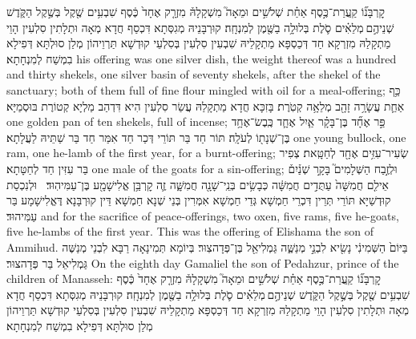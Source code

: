 {קׇרְבָּנ֞וֹ קַֽעֲרַת־כֶּ֣סֶף אַחַ֗ת שְׁלֹשִׁ֣ים וּמֵאָה֮ מִשְׁקָלָהּ֒ מִזְרָ֤ק אֶחָד֙ כֶּ֔סֶף שִׁבְעִ֥ים שֶׁ֖קֶל בְּשֶׁ֣קֶל הַקֹּ֑דֶשׁ שְׁנֵיהֶ֣ם \legarmeh  מְלֵאִ֗ים סֹ֛לֶת בְּלוּלָ֥ה בַשֶּׁ֖מֶן לְמִנְחָֽה׃}
{קוּרְבָּנֵיהּ מְגִסְּתָא דִּכְסַף חֲדָא מְאָה וּתְלָתִין סִלְעִין הָוֵי מַתְקָלַהּ מִזְרְקָא חַד דְּכַסְפָּא מַתְקָלֵיהּ שִׁבְעִין סִלְעִין בְּסִלְעֵי קוּדְשָׁא תַּרְוֵיהוֹן מְלַן סוּלְתָּא דְּפִילָא בִמְשַׁח לְמִנְחָתָא׃}
{his offering was one silver dish, the weight thereof was a hundred and thirty shekels, one silver basin of seventy shekels, after the shekel of the sanctuary; both of them full of fine flour mingled with oil for a meal-offering;}{}
{כַּ֥ף אַחַ֛ת עֲשָׂרָ֥ה זָהָ֖ב מְלֵאָ֥ה קְטֹֽרֶת׃}
{בָּזִכָּא חֲדָא מַתְקָלַהּ עֲשַׂר סִלְעִין הִיא דִּדְהַב מַלְיָא קְטוֹרֶת בּוּסְמַיָּא׃}
{one golden pan of ten shekels, full of incense;}{}
{פַּ֣ר אֶחָ֞ד בֶּן־בָּקָ֗ר אַ֧יִל אֶחָ֛ד כֶּֽבֶשׂ־אֶחָ֥ד בֶּן־שְׁנָת֖וֹ לְעֹלָֽה׃}
{תּוֹר חַד בַּר תּוֹרֵי דְּכַר חַד אִמַּר חַד בַּר שַׁתֵּיהּ לַעֲלָתָא׃}
{one young bullock, one ram, one he-lamb of the first year, for a burnt-offering;}{}
{שְׂעִיר־עִזִּ֥ים אֶחָ֖ד לְחַטָּֽאת׃}
{צְפִיר בַּר עִזִּין חַד לְחַטָּתָא׃}
{one male of the goats for a sin-offering;}{}
{וּלְזֶ֣בַח הַשְּׁלָמִים֮ בָּקָ֣ר שְׁנַ֒יִם֒ אֵילִ֤ם חֲמִשָּׁה֙ עַתֻּדִ֣ים חֲמִשָּׁ֔ה כְּבָשִׂ֥ים בְּנֵֽי־שָׁנָ֖ה חֲמִשָּׁ֑ה זֶ֛ה קׇרְבַּ֥ן אֱלִישָׁמָ֖ע בֶּן־עַמִּיהֽוּד׃ \petucha }
{וּלְנִכְסַת קוּדְשַׁיָּא תּוֹרֵי תְּרֵין דִּכְרֵי חַמְשָׁא גְּדֵי חַמְשָׁא אִמְּרִין בְּנֵי שְׁנָא חַמְשָׁא דֵּין קוּרְבָּנָא דֶּאֱלִישָׁמָע בַּר עַמִּיהוּד׃}
{and for the sacrifice of peace-offerings, two oxen, five rams, five he-goats, five he-lambs of the first year. This was the offering of Elishama the son of Ammihud.}{}
{בַּיּוֹם֙ הַשְּׁמִינִ֔י נָשִׂ֖יא לִבְנֵ֣י מְנַשֶּׁ֑ה גַּמְלִיאֵ֖ל בֶּן־פְּדָהצֽוּר׃}
{בְּיוֹמָא תְּמִינָאָה רַבָּא לִבְנֵי מְנַשֶּׁה גַּמְלִיאֵל בַּר פְּדָהצוּר׃}
{On the eighth day Gamaliel the son of Pedahzur, prince of the children of Manasseh:}{}
{קׇרְבָּנ֞וֹ קַֽעֲרַת־כֶּ֣סֶף אַחַ֗ת שְׁלֹשִׁ֣ים וּמֵאָה֮ מִשְׁקָלָהּ֒ מִזְרָ֤ק אֶחָד֙ כֶּ֔סֶף שִׁבְעִ֥ים שֶׁ֖קֶל בְּשֶׁ֣קֶל הַקֹּ֑דֶשׁ שְׁנֵיהֶ֣ם \legarmeh  מְלֵאִ֗ים סֹ֛לֶת בְּלוּלָ֥ה בַשֶּׁ֖מֶן לְמִנְחָֽה׃}
{קוּרְבָּנֵיהּ מְגִסְּתָא דִּכְסַף חֲדָא מְאָה וּתְלָתִין סִלְעִין הָוֵי מַתְקָלַהּ מִזְרְקָא חַד דְּכַסְפָּא מַתְקָלֵיהּ שִׁבְעִין סִלְעִין בְּסִלְעֵי קוּדְשָׁא תַּרְוֵיהוֹן מְלַן סוּלְתָּא דְּפִילָא בִמְשַׁח לְמִנְחָתָא׃}
